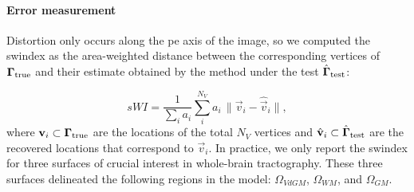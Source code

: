 \paragraph*{Error measurement}\label{sec:experiments_evaluation}
Distortion only occurs along the \gls*{pe} axis of the image, so we computed the
  \gls*{swindex} as the area-weighted distance between the corresponding vertices of
  $\boldsymbol{\Gamma}_\text{true}$ and their estimate obtained by the method under the test $\hat{\boldsymbol{\Gamma}}_\text{test}$:

  \begin{equation}
  sWI = \frac{1}{\sum_i a_i} \sum\limits_i^{N_V} a_i\,\|
  \vec{v}_i - \hat{\vec{v}}_i \|,
  \label{eq:swindex}
  \end{equation}
  where $\mathbf{v}_i \subset \boldsymbol{\Gamma}_\text{true}$ are the locations of the total $N_V$ vertices
  and $\hat{\mathbf{v}}_i \subset \hat{\boldsymbol{\Gamma}}_\text{test}$ are the recovered locations
  that correspond to $\vec{v}_i$.
In practice, we only report the \gls*{swindex} for three surfaces of crucial interest in whole-brain
  tractography.
These three surfaces delineated the following regions in the model: $\Omega_{VdGM}$, $\Omega_{WM}$, and $\Omega_{GM}$.